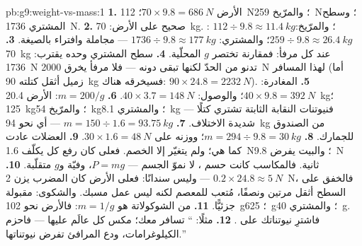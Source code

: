 \begin{solution}{pb:g9:weight-vs-mass:1}
\textbf{1.} الأرض $70 \times 9.8 = \qty{686}{N}$؛ 
\qty{112}{N}؛ والمرّيخ \qty{259}{N}؛ وسطح المشتري
\qty{1736}{N}.
\textbf{2.} صحيح على الأرض: \qty{70}{kg}. : $112 \div
9.8 \approx \qty{11.4}{kg}$؛ والمرّيخ: $259 \div 9.8 \approx
\qty{26.4}{kg}$؛ والمشتري: $1736 \div 9.8 \approx
\qty{177}{kg}$ --- مجاملة وافتراء بالصيغة.
\textbf{3.} \qty{70}{kg} عند كل مرفأ: فمقارنة 
تختصر $g$ المحلّية.
\textbf{4.} سطح المشتري وحده يقترب: \qty{1736}{N} تدنو من
الحدّ لكنها تبقى دونه --- فلا مرفأ يخرق \qty{2000}{N} لهذا
المسافر (أما زميل أثقل كتلته \qty{90}{kg} فسيخرقه هناك:
$90 \times 24.8 = \qty{2232}{N}$).
\textbf{5.} المغادرة: $40 \times 9.8 = \qty{392}{N}$؛
والوصول: $40 \times 3.7 = \qty{148}{N}$.
\textbf{6.} $m = 200/g$: الأرض \qty{20.4}{kg}؛ 
\qty{125}{kg}؛ والمرّيخ \qty{54}{kg}؛ والمشتري \qty{8.1}{kg}
--- فنيوتنات النقابة الثابتة تشتري كتلًا شديدة الاختلاف.
\textbf{7.} $m = 150 \div 1.6 = \qty{93.75}{kg}$ --- أي نحو
\qty{94}{kg} من الصندوق للجمارك.
\textbf{8.} $m = 294 \div 9.8 = \qty{30}{kg}$؛ ووزنه على
 $30 \times 1.6 = \qty{48}{N}$.
\textbf{9.} العضلات  عادت كما هي؛ ولم يتغيّر إلا
الخصم. فعلى  كان رفع كل  يكلّف \qty{1.6}{N}؛
والبيت يفرض \qty{9.8}{N} ثانية. فالمكاسب كانت حسم ، لا
نموّ الجسم --- $P = m g$،  وفيّة و$g$ متقلّبة.
\textbf{10.} $0.2 \times 24.8 \approx \qty{5}{N}$ --- وليس
سندانًا: فعلى الأرض كان المضرب يزن \qty{2}{N}، فالخفق على
السطح أثقل مرتين ونصفًا، مُتعب للمعصم لكنه ليس عمل مسبك.
والشكوى: مقبولة جزئيًّا.
\textbf{11.}  من الشوكولاتة هو $m = 1/g$: فالأرض نحو
\qty{102}{g}؛  \qty{625}{g}؛ والمشتري \qty{40}{g}.
فاشترِ نيوتناتك على .
\textbf{12.} مثلًا: `` تسافر معك؛  مكس كل عالَم
عليها --- فاحزم الكيلوغرامات، ودع المرافئ تفرض نيوتناتها.''
\end{solution}
